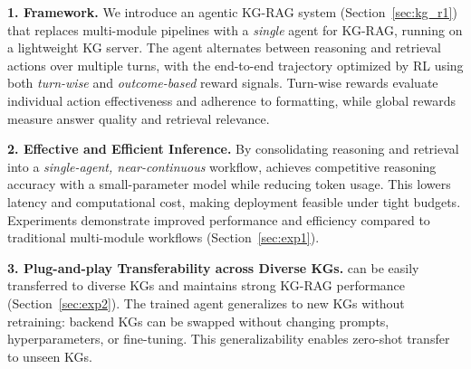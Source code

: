 \noindent \textbf{1. \framework{} Framework.} We introduce an agentic KG-RAG system (Section~\ref{sec:kg_r1}) that replaces multi-module pipelines with a \emph{single} agent for KG-RAG, running on a lightweight KG server. The agent alternates between reasoning and retrieval actions over multiple turns, with the end-to-end trajectory optimized by RL using both \emph{turn-wise} and \emph{outcome-based} reward signals. Turn-wise rewards evaluate individual action effectiveness and adherence to formatting, while global rewards measure answer quality and retrieval relevance.

\noindent \textbf{2. Effective and Efficient Inference.} By consolidating reasoning and retrieval into a \emph{single-agent, near-continuous} workflow, \framework{} achieves competitive reasoning accuracy with a small-parameter model while reducing token usage. This lowers latency and computational cost, making deployment feasible under tight budgets. Experiments demonstrate improved performance and efficiency compared to traditional multi-module workflows (Section~\ref{sec:exp1}). 

\noindent \textbf{3. Plug-and-play Transferability across Diverse KGs.} \framework{} can be easily transferred to diverse KGs and maintains strong KG-RAG performance (Section~\ref{sec:exp2}). The trained \framework{} agent generalizes to new KGs without retraining: backend KGs can be swapped without changing prompts, hyperparameters, or fine-tuning. This generalizability enables zero-shot transfer to unseen KGs.



 







